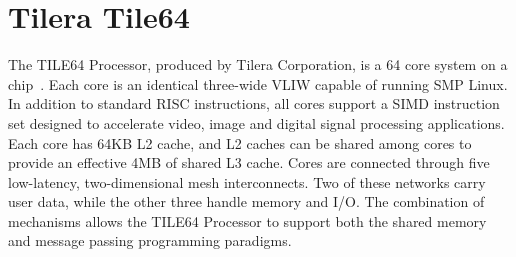 \section{Tilera Tile64}

The TILE64 Processor, produced by Tilera Corporation, is a 64 core
system on a chip~\cite{Tilera08}.  Each core is an identical
three-wide VLIW capable of running SMP Linux.  In addition to standard
RISC instructions, all cores support a SIMD instruction set designed
to accelerate video, image and digital signal processing applications.
Each core has 64KB L2 cache, and L2 caches can be shared among cores
to provide an effective 4MB of shared L3 cache.  Cores are connected
through five low-latency, two-dimensional mesh interconnects.  Two of
these networks carry user data, while the other three handle memory
and I/O. The combination of mechanisms allows the TILE64 Processor to
support both the shared memory and message passing programming
paradigms.
